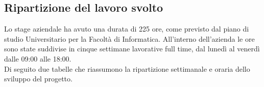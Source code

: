 \subsection{Ripartizione del lavoro svolto}
Lo stage aziendale ha avuto una durata di 225 ore, come previsto dal piano di studio Universitario per la Facoltà di Informatica. All’interno dell’azienda le ore sono state suddivise in cinque settimane lavorative full time, dal lunedì al venerdì dalle 09:00 alle 18:00.\\
Di seguito due tabelle che riassumono la ripartizione settimanale e oraria dello sviluppo del progetto.\\
